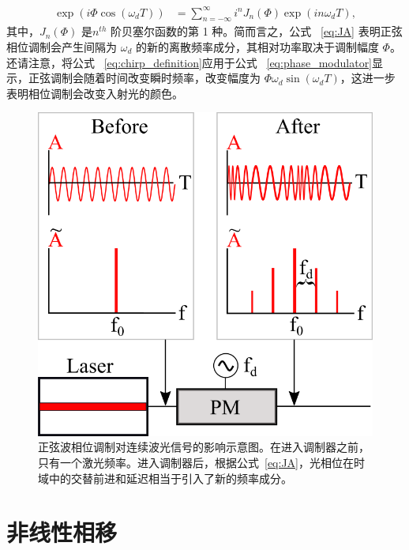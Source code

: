 \begin{align}
\label{eq:JA}
    \exp\left(i\Phi\cos(\omega_dT)\right) &= \sum_{n=-\infty}^{\infty}i^n J_n(\Phi) \exp\left(in\omega_dT\right),
\end{align}
其中，$J_n(\Phi)$ 是$n^{th}$ 阶贝塞尔函数的第 1 种。简而言之，公式 ~\ref{eq:JA} 表明正弦相位调制会产生间隔为 $\omega_d$ 的新的离散频率成分，其相对功率取决于调制幅度 $\Phi$。还请注意，将公式 ~\ref{eq:chirp_definition}应用于公式 ~\ref{eq:phase_modulator}显示，正弦调制会随着时间改变瞬时频率，改变幅度为 $\Phi\omega_d\sin(\omega_dT)$，这进一步表明相位调制会改变入射光的颜色。
\begin{figure}
    \centering
    \includegraphics[width=1\linewidth]{figures/PhaseModulator.png}
    \caption{正弦波相位调制对连续波光信号的影响示意图。在进入调制器之前，只有一个激光频率。进入调制器后，根据公式~\ref{eq:JA}，光相位在时域中的交替前进和延迟相当于引入了新的频率成分。}
    \label{fig:PM}
\end{figure}

\section{非线性相移}
\label{sec:sidebands}


